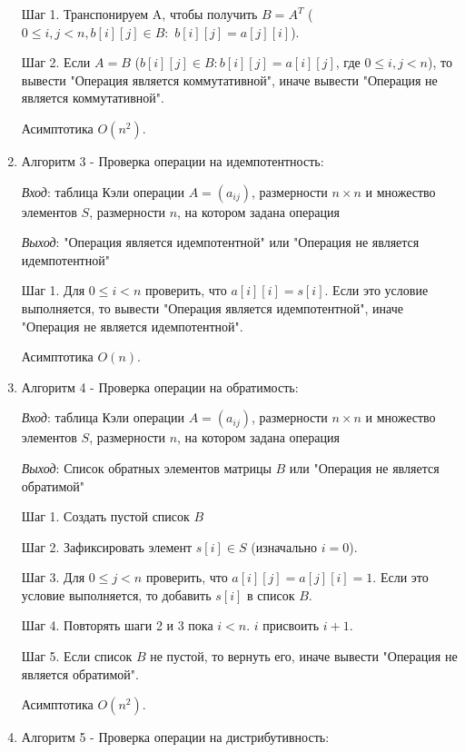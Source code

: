 \documentclass[spec, och, labwork]{shiza}
\begin{document}
\begin{enumerate}
                Шаг 1. Транспонируем A, чтобы получить $B = A^T$ ($0 \leq i, j < n, b[i][j] \in B:$ $b[i][j] = a[j][i]$).

                Шаг 2. Если $A = B$ ($b[i][j] \in B: b[i][j] = a[i][j] $, где $0 \leq i, j < n$), то вывести "Операция является коммутативной", иначе вывести "Операция не является коммутативной".

                Асимптотика $O(n^2)$.

                \item Алгоритм 3 - Проверка операции на идемпотентность:
                
                \textit{Вход}: таблица Кэли операции $A = (a_{ij})$, размерности $n \times n$ и множество элементов $S$, размерности $n$, на котором задана операция

                \textit{Выход}: "Операция является идемпотентной" или "Операция не является идемпотентной"

                Шаг 1. Для $0 \leq i < n$ проверить, что $a[i][i] = s[i]$. Если это условие выполняется, то вывести "Операция является идемпотентной", иначе "Операция не является идемпотентной".

                Асимптотика $O(n)$.

                \item Алгоритм 4 - Проверка операции на обратимость:
                
                \textit{Вход}: таблица Кэли операции $A = (a_{ij})$, размерности $n \times n$ и множество элементов $S$, размерности $n$, на котором задана операция

                \textit{Выход}: Список обратных элементов матрицы $B$ или "Операция не является обратимой"

                Шаг 1. Создать пустой список $B$

                Шаг 2. Зафиксировать элемент $s[i] \in S$ (изначально $i = 0$).

                Шаг 3. Для $0 \leq j < n$ проверить, что $a[i][j] = a[j][i] = 1$. Если это условие выполняется, то добавить $s[i]$ в список $B$.

                Шаг 4. Повторять шаги 2 и 3 пока $i < n$. $i$ присвоить $i + 1$.

                Шаг 5. Если список $B$ не пустой, то вернуть его, иначе вывести "Операция не является обратимой".

                Асимптотика $O(n^2)$.

                \item Алгоритм 5 - Проверка операции на дистрибутивность:
                

\end{enumerate}
\end{document}
